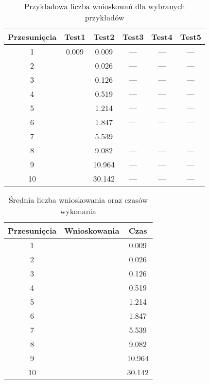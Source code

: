         \begin{table}[H]
            \centering
             \begin{tabular}{||c | c | c | c | c | c |} 
             \hline
             Przesunięcia & Test1 & Test2 & Test3 & Test4 & Test5 \\ [0.5ex] 
             \hline\hline
             1 & 0.009 & 0.009 & --- & --- & --- \\ 
             \hline
             2 &  & 0.026 & --- & --- & --- \\
             \hline
             3 &  & 0.126 & --- & --- & --- \\
             \hline
             4 &  & 0.519 & --- & --- & --- \\
             \hline
             5 &  & 1.214 & --- & --- & --- \\
             \hline
             6 &  & 1.847 & --- & --- & ---\\ 
             \hline
             7 &  & 5.539 & --- & --- & --- \\
             \hline
             8 &  & 9.082 & --- & --- & --- \\
             \hline
             9 &  & 10.964 & --- & --- & --- \\
             \hline
             10 &  & 30.142 & --- & --- & --- \\ [1ex]
             \hline
             \end{tabular}
             \caption{Przykładowa liczba wnioskowań dla wybranych przykładów}
        \end{table}
    
        \begin{table}[H]
            \centering
             \begin{tabular}{||c | c | c|} 
             \hline
             Przesunięcia & Wnioskowania & Czas \\ [0.5ex] 
             \hline\hline
             1 &  & 0.009 \\ 
             \hline
             2 &  & 0.026 \\
             \hline
             3 &  & 0.126  \\
             \hline
             4 &  & 0.519  \\
             \hline
             5 &  & 1.214 \\
             \hline
             6 &  & 1.847 \\ 
             \hline
             7 &  & 5.539 \\
             \hline
             8 &  & 9.082 \\
             \hline
             9 &  & 10.964 \\
             \hline
             10 &  & 30.142 \\ [1ex]
             \hline
             \end{tabular}
             \caption{Średnia liczba wnioskowania oraz czasów wykonania}
        \end{table}

